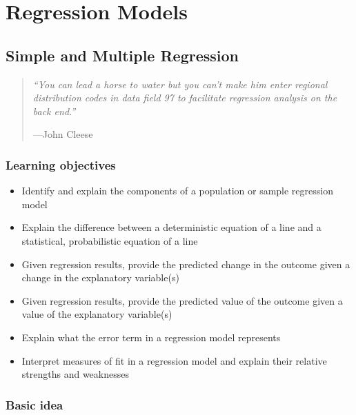 \documentclass[
]{book}
\providecommand{\tightlist}{%
  \setlength{\itemsep}{0pt}\setlength{\parskip}{0pt}}
\newenvironment{learncheck}%
{%
  \par\vspace{\baselineskip}\noindent 
  \color{Exercise}\begin{itshape}%
  \par\vspace{\baselineskip}\noindent\ignorespaces 
}%
{%
  \end{itshape}\ignorespacesafterend 
}
\begin{document}
\hypertarget{part-regression-models}{%
\part{Regression Models}\label{part-regression-models}}

\hypertarget{simple-and-multiple-regression}{%
\chapter{Simple and Multiple Regression}\label{simple-and-multiple-regression}}

\begin{quote}
\emph{``You can lead a horse to water but you can't make him enter regional distribution codes in data field 97 to facilitate regression analysis on the back end.''}

---John Cleese
\end{quote}

\hypertarget{lo6}{%
\section{Learning objectives}\label{lo6}}

\begin{learncheck}
\begin{itemize}
\tightlist
\item
  Identify and explain the components of a population or sample
  regression model
\item
  Explain the difference between a deterministic equation of a line and
  a statistical, probabilistic equation of a line
\item
  Given regression results, provide the predicted change in the outcome
  given a change in the explanatory variable(s)
\item
  Given regression results, provide the predicted value of the outcome
  given a value of the explanatory variable(s)
\item
  Explain what the error term in a regression model represents
\item
  Interpret measures of fit in a regression model and explain their
  relative strengths and weaknesses
\end{itemize}
\end{learncheck}

\hypertarget{basic-idea}{%
\section{Basic idea}\label{basic-idea}}
\end{document}
